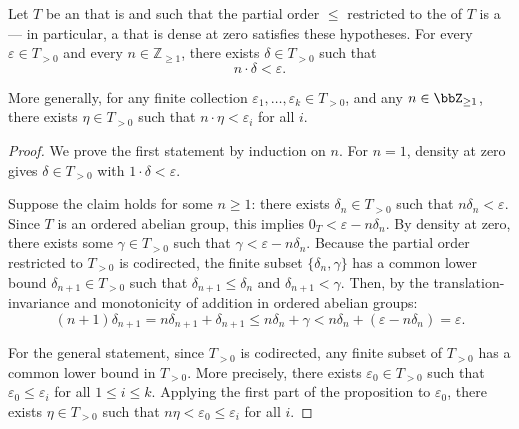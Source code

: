 \begin{proposition} \label{proposition:small_scalar_multiples_in_dense_at_zero_ordered_abelian_group}
Let $T$ be an  that is  and such that the partial order $\leq$ restricted to the  of $T$ is a  --- in particular, a  that is dense at zero satisfies these hypotheses. For every $\varepsilon \in T_{>0}$ and every $n \in \mathbb{Z}_{\geq 1}$, there exists $\delta \in T_{>0}$ such that
$$n \cdot \delta < \varepsilon.$$

More generally, for any finite collection $\varepsilon_1, \dots, \varepsilon_k \in T_{>0}$, and any $n \in \bbZ_{\geq 1}$, there exists $\eta \in T_{>0}$ such that $n \cdot \eta < \varepsilon_i$ for all $i$.
\end{proposition}


\begin{proof}
We prove the first statement by induction on $n$. For $n = 1$, density at zero gives $\delta \in T_{>0}$ with $1 \cdot \delta < \varepsilon$.

Suppose the claim holds for some $n \geq 1$: there exists $\delta_n \in T_{>0}$ such that $n\delta_n < \varepsilon$. Since $T$ is an ordered abelian group, this implies $0_T < \varepsilon - n\delta_n$. By density at zero, there exists some $\gamma \in T_{>0}$ such that $\gamma < \varepsilon - n\delta_n$. Because the partial order restricted to $T_{>0}$ is codirected, the finite subset $\{\delta_n, \gamma\}$ has a common lower bound $\delta_{n+1} \in T_{>0}$ such that $\delta_{n+1} \leq \delta_n$ and $\delta_{n+1} < \gamma$. Then, by the translation-invariance and monotonicity of addition in ordered abelian groups:
$$ (n+1)\delta_{n+1} = n\delta_{n+1} + \delta_{n+1} \leq n\delta_n + \gamma < n\delta_n + (\varepsilon - n\delta_n) = \varepsilon. $$

For the general statement, since $T_{>0}$ is codirected, any finite subset of $T_{>0}$ has a common lower bound in $T_{>0}$. More precisely, there exists $\varepsilon_0 \in T_{>0}$ such that $\varepsilon_0 \leq \varepsilon_i$ for all $1 \leq i \leq k$. Applying the first part of the proposition to $\varepsilon_0$, there exists $\eta \in T_{>0}$ such that $n\eta < \varepsilon_0 \leq \varepsilon_i$ for all $i$.
\end{proof}
